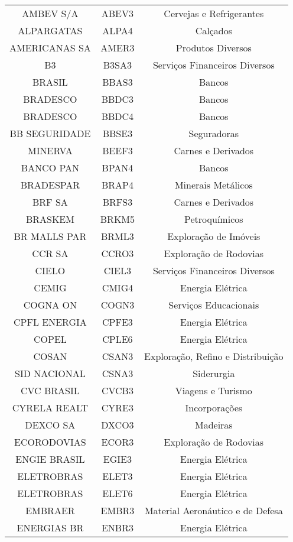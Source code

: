 {\begin{longtable}[c]{ccc}
    AMBEV S/A & ABEV3 & Cervejas e Refrigerantes \\
    ALPARGATAS & ALPA4 & Calçados \\
    AMERICANAS SA & AMER3 & Produtos Diversos \\
    B3 & B3SA3 & Serviços Financeiros Diversos \\
    BRASIL & BBAS3 & Bancos \\
    BRADESCO & BBDC3 & Bancos \\
    BRADESCO & BBDC4 & Bancos \\
    BB SEGURIDADE & BBSE3 & Seguradoras \\
    MINERVA & BEEF3 & Carnes e Derivados \\
    BANCO PAN & BPAN4 & Bancos \\
    BRADESPAR & BRAP4 & Minerais Metálicos \\
    BRF SA & BRFS3 & Carnes e Derivados \\
    BRASKEM & BRKM5 & Petroquímicos \\
    BR MALLS PAR & BRML3 & Exploração de Imóveis \\
    CCR SA & CCRO3 & Exploração de Rodovias \\
    CIELO & CIEL3 & Serviços Financeiros Diversos \\
    CEMIG & CMIG4 & Energia Elétrica \\
    COGNA ON & COGN3 & Serviços Educacionais \\
    CPFL ENERGIA & CPFE3 & Energia Elétrica \\
    COPEL & CPLE6 & Energia Elétrica \\
    COSAN & CSAN3 & Exploração, Refino e Distribuição \\
    SID NACIONAL & CSNA3 & Siderurgia \\
    CVC BRASIL & CVCB3 & Viagens e Turismo \\
    CYRELA REALT & CYRE3 & Incorporações \\
    DEXCO SA & DXCO3 & Madeiras \\
    ECORODOVIAS & ECOR3 & Exploração de Rodovias \\
    ENGIE BRASIL & EGIE3 & Energia Elétrica \\
    ELETROBRAS & ELET3 & Energia Elétrica \\
    ELETROBRAS & ELET6 & Energia Elétrica \\
    EMBRAER & EMBR3 & Material Aeronáutico e de Defesa \\
    ENERGIAS BR & ENBR3 & Energia Elétrica \\

\end{longtable}}
